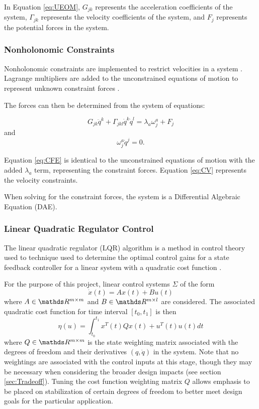 In Equation \ref{eq:UEOM}, $G_{jk}$ represents the acceleration coefficients of the system, $\Gamma_{jk}$ represents the velocity coefficients of the system, and $F_j$ represents the potential forces in the system.

\subsubsection{Nonholonomic Constraints}

Nonholonomic constraints are implemented to restrict velocities in a system \cite{LagrangeEquations}.
Lagrange multipliers are added to the unconstrained equations of motion to represent unknown constraint forces \cite{ClassicalMechanics}.
\par
The forces can then be determined from the system of equations:

\begin{equation}
\label{eq:CFE}
G_{jk} \ddot{q}^k + \Gamma_{jkl} \dot{q}^k\dot{q}^l  = \lambda_{a}\omega_{j}^{a} + F_{j}
\end{equation}
and
\begin{equation}
\label{eq:CV}
\omega_{j}^{a} \dot{q}^{j} = 0.
\end{equation}

Equation \ref{eq:CFE} is identical to the unconstrained equations of motion with the added $\lambda_{a}$ term, representing the constraint forces.
Equation \ref{eq:CV} represents the velocity constraints. 
\par
When solving for the constraint forces, the system is a Differential Algebraic Equation (DAE).

\subsubsection{Linear Quadratic Regulator Control}
The linear quadratic regulator (LQR) algorithm is a method in control theory used to technique used to determine the optimal control gains for a state feedback controller for a linear system with a quadratic cost function \cite{LabManual}.

For the purpose of this project, linear control systems $\Sigma$ of the form
\begin{equation}
\dot{x}(t) = Ax(t) + Bu(t)
\end{equation}
where $A \in \R^{m \times m}$ and $B \in \R^{m \times l}$ are considered.
The associated quadratic cost function for time interval $[t_{0},t_{1}]$ is then 
\begin{equation}
\eta(u) = \int_{t_{0}}^{t_{1}}x^{T}(t)Qx(t)+u^{T}(t)u(t)dt
\end{equation}
where $Q \in \R^{m \times m}$ is the state weighting matrix associated with the degrees of freedom and their derivatives $(q, \dot{q})$ in the system. Note that no weightings are associated with the control inputs at this stage, though they may be necessary when considering the broader design impacts (see section \ref{sec:Tradeoff}). Tuning the cost function weighting matrix $Q$ allows emphasis to be placed on stabilization of certain degrees of freedom to better meet design goals for the particular application.

